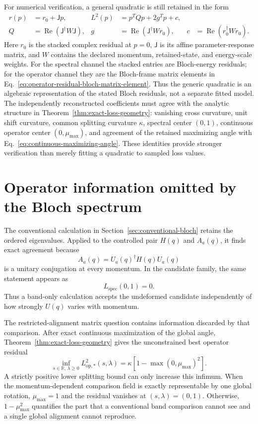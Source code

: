 \documentclass[11pt]{article}
\begin{document}
For numerical verification, a general quadratic is still retained in the form
\begin{align}
 r(p)&=r_0+\mathsf Jp,
 &L^2(p)&=p^TQp+2g^Tp+c,\nonumber\\
 Q&=\operatorname{Re}(\mathsf J^\dagger W\mathsf J),
 &g&=\operatorname{Re}(\mathsf J^\dagger Wr_0),
 &c&=\operatorname{Re}(r_0^\dagger Wr_0).
 \label{eq:quadratic}
\end{align}
Here $r_0$ is the stacked complex residual at $p=0$, $\mathsf J$ is its affine
parameter-response matrix, and $W$ contains the declared momentum, retained-state, and
energy-scale weights. For the spectral channel the stacked entries are Bloch-energy
residuals; for the operator channel they are the Bloch-frame matrix elements in
Eq.~\eqref{eq:operator-residual-bloch-matrix-element}. Thus the generic quadratic is an
algebraic representation of the stated Bloch residuals, not a separate fitted model.
The independently reconstructed coefficients must agree with the analytic structure in
Theorem~\ref{thm:exact-loss-geometry}: vanishing cross curvature, unit shift curvature,
common splitting curvature $\kappa$, spectral center $(0,1)$, continuous operator center
$(0,\mu_{\max})$, and agreement of the retained maximizing angle with
Eq.~\eqref{eq:continuous-maximizing-angle}. These identities provide stronger
verification than merely fitting a quadratic to sampled loss values.

\section{Operator information omitted by the Bloch spectrum}

The conventional calculation in Section~\ref{sec:conventional-bloch} retains the
ordered eigenvalues. Applied to the controlled pair $H(q)$ and $A_a(q)$, it finds exact
agreement because
\[
 A_a(q)=U_a(q)^\dagger H(q)U_a(q)
\]
is a unitary conjugation at every momentum. In the candidate family, the same statement
appears as
\begin{equation}
 L_{\mathrm{spec}}(0,1)=0.
 \label{eq:conventional-band-result}
\end{equation}
Thus a band-only calculation accepts the undeformed candidate independently of how
strongly $U(q)$ varies with momentum.

The restricted-alignment matrix question contains information discarded by that
comparison. After exact continuous maximization of the global angle,
Theorem~\ref{thm:exact-loss-geometry} gives the unconstrained best operator residual
\begin{equation}
 \inf_{s\in\mathbb R,\,\lambda\ge0}L_{\mathrm{op},*}^2(s,\lambda)
 =\kappa\left[1-\max(0,\mu_{\max})^2\right].
 \label{eq:operator-blind-spot}
\end{equation}
A strictly positive lower splitting bound can only increase this infimum.
When the momentum-dependent comparison field is exactly representable by one global
rotation, $\mu_{\max}=1$ and the residual vanishes at $(s,\lambda)=(0,1)$. Otherwise,
$1-\mu_{\max}^2$ quantifies the part that a conventional band comparison cannot see and
a single global alignment cannot reproduce.
\end{document}
